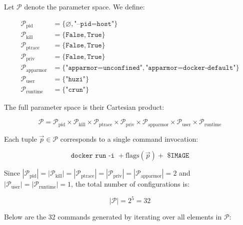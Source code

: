 \documentclass[12pt]{report}
\begin{document}
\begin{doublespace}
Let $\mathcal{P}$ denote the parameter space. We define:

\[
\begin{aligned}
\mathcal{P}_{\text{pid}} &= \{\varnothing, \texttt{"--pid=host"}\} \\
\mathcal{P}_{\text{kill}} &= \{\texttt{False}, \texttt{True}\} \\
\mathcal{P}_{\text{ptrace}} &= \{\texttt{False}, \texttt{True}\} \\
\mathcal{P}_{\text{priv}} &= \{\texttt{False}, \texttt{True}\} \\
\mathcal{P}_{\text{apparmor}} &= \{\texttt{"apparmor=unconfined"}, \texttt{"apparmor=docker-default"}\} \\
\mathcal{P}_{\text{user}} &= \{\texttt{"huzi"}\} \\
\mathcal{P}_{\text{runtime}} &= \{\texttt{"crun"}\}
\end{aligned}
\]

The full parameter space is their Cartesian product:

\[
\mathcal{P} = \mathcal{P}_{\text{pid}} \times \mathcal{P}_{\text{kill}} \times \mathcal{P}_{\text{ptrace}} \times \mathcal{P}_{\text{priv}} \times \mathcal{P}_{\text{apparmor}} \times \mathcal{P}_{\text{user}} \times \mathcal{P}_{\text{runtime}}
\]

Each tuple $\vec{p} \in \mathcal{P}$ corresponds to a single command invocation:

\[
\texttt{docker run -i } + \text{flags}(\vec{p}) + \texttt{ \$IMAGE}
\]

Since \(|\mathcal{P}_{\text{pid}}| = |\mathcal{P}_{\text{kill}}| = |\mathcal{P}_{\text{ptrace}}| = |\mathcal{P}_{\text{priv}}| = |\mathcal{P}_{\text{apparmor}}| = 2\) and \(|\mathcal{P}_{\text{user}}| = |\mathcal{P}_{\text{runtime}}| = 1\), the total number of configurations is:

\[
|\mathcal{P}| = 2^5 = 32
\]

\noindent Below are the 32 commands generated by iterating over all elements in $\mathcal{P}$:


\end{doublespace}
\end{document}
